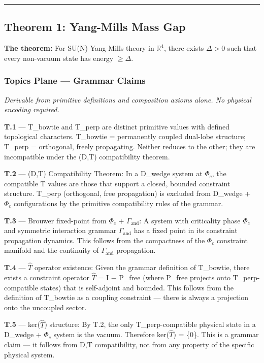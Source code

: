 \documentclass[11pt,a4paper]{article}
\begin{document}
\begin{center}
\rule{0.5\textwidth}{0.4pt}
\end{center}

\subsection{Theorem 1: Yang-Mills Mass Gap}

\textbf{The theorem:} For SU(N) Yang-Mills theory in $\mathbb{R}^4$, there exists $\Delta > 0$ such that every non-vacuum state has energy $\geq \Delta$.

\subsubsection{Topics Plane --- Grammar Claims}

\emph{Derivable from primitive definitions and composition axioms alone. No physical encoding required.}

\textbf{T.1} --- T\_bowtie and T\_perp are distinct primitive values with defined topological characters. T\_bowtie = permanently coupled dual-lobe structure; T\_perp = orthogonal, freely propagating. Neither reduces to the other; they are incompatible under the (D,T) compatibility theorem.

\textbf{T.2} --- (D,T) Compatibility Theorem: In a D\_wedge system at $\Phi_c$, the compatible T values are those that support a closed, bounded constraint structure. T\_perp (orthogonal, free propagation) is excluded from D\_wedge + $\Phi_c$ configurations by the primitive compatibility rules of the grammar.

\textbf{T.3} --- Brouwer fixed-point from $\Phi_c$ + $\Gamma_\text{and}$: A system with criticality phase $\Phi_c$ and symmetric interaction grammar $\Gamma_\text{and}$ has a fixed point in its constraint propagation dynamics. This follows from the compactness of the $\Phi_c$ constraint manifold and the continuity of $\Gamma_\text{and}$ propagation.

\textbf{T.4} --- $\hat{T}$ operator existence: Given the grammar definition of T\_bowtie, there exists a constraint operator $\hat{T}$ = I $-$ P\_free (where P\_free projects onto T\_perp-compatible states) that is self-adjoint and bounded. This follows from the definition of T\_bowtie as a coupling constraint --- there is always a projection onto the uncoupled sector.

\textbf{T.5} --- ker($\hat{T}$) structure: By T.2, the only T\_perp-compatible physical state in a D\_wedge + $\Phi_c$ system is the vacuum. Therefore ker($\hat{T}$) = \{\textbar{}0\rangle\}. This is a grammar claim --- it follows from D,T compatibility, not from any property of the specific physical system.
\end{document}
